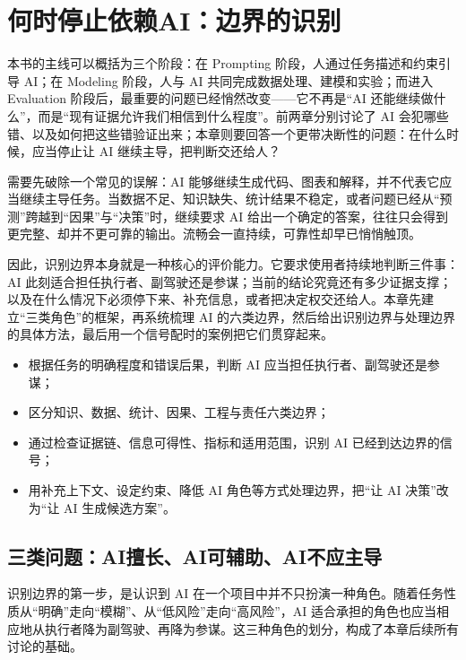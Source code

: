 \chapter{何时停止依赖AI：边界的识别}

本书的主线可以概括为三个阶段：在 Prompting 阶段，人通过任务描述和约束引导 AI；在 Modeling 阶段，人与 AI 共同完成数据处理、建模和实验；而进入 Evaluation 阶段后，最重要的问题已经悄然改变——它不再是“AI 还能继续做什么”，而是“现有证据允许我们相信到什么程度”。前两章分别讨论了 AI 会犯哪些错、以及如何把这些错验证出来；本章则要回答一个更带决断性的问题：在什么时候，应当停止让 AI 继续主导，把判断交还给人？

需要先破除一个常见的误解：AI 能够继续生成代码、图表和解释，并不代表它应当继续主导任务。当数据不足、知识缺失、统计结果不稳定，或者问题已经从“预测”跨越到“因果”与“决策”时，继续要求 AI 给出一个确定的答案，往往只会得到更完整、却并不更可靠的输出。流畅会一直持续，可靠性却早已悄悄触顶。

因此，识别边界本身就是一种核心的评价能力。它要求使用者持续地判断三件事：AI 此刻适合担任执行者、副驾驶还是参谋；当前的结论究竟还有多少证据支撑；以及在什么情况下必须停下来、补充信息，或者把决定权交还给人。本章先建立“三类角色”的框架，再系统梳理 AI 的六类边界，然后给出识别边界与处理边界的具体方法，最后用一个信号配时的案例把它们贯穿起来。

\begin{chapterguide}
\begin{itemize}
  \item 根据任务的明确程度和错误后果，判断 AI 应当担任执行者、副驾驶还是参谋；
  \item 区分知识、数据、统计、因果、工程与责任六类边界；
  \item 通过检查证据链、信息可得性、指标和适用范围，识别 AI 已经到达边界的信号；
  \item 用补充上下文、设定约束、降低 AI 角色等方式处理边界，把“让 AI 决策”改为“让 AI 生成候选方案”。
\end{itemize}
\end{chapterguide}

\section{三类问题：AI擅长、AI可辅助、AI不应主导}

识别边界的第一步，是认识到 AI 在一个项目中并不只扮演一种角色。随着任务性质从“明确”走向“模糊”、从“低风险”走向“高风险”，AI 适合承担的角色也应当相应地从执行者降为副驾驶、再降为参谋。这三种角色的划分，构成了本章后续所有讨论的基础。

